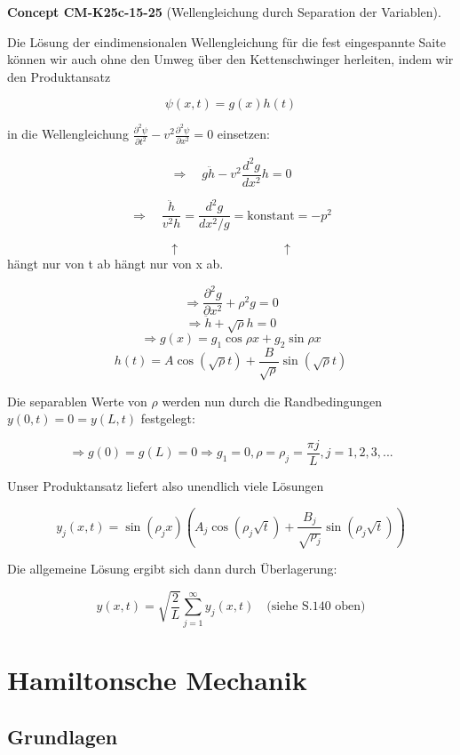 \documentclass[10pt, letterpaper]{article}
\newcommand{\CustomHeading}[3]{%
  \par\medskip\noindent%
  \textbf{#1 #2} \textnormal{(#3)}.\enskip%
}
\newenvironment{CONC}[2]{\CustomHeading{Concept}{#1}{#2}}{}
\begin{document}
\begin{CONC}{CM-K25c-15-25}{Wellengleichung durch Separation der Variablen}
Die Lösung der eindimensionalen Wellengleichung für die fest eingespannte Saite können wir auch ohne den Umweg über den Kettenschwinger herleiten, indem wir den Produktansatz

\[\psi(x,t) = g(x)h(t)\]

in die Wellengleichung $\frac{\partial^2\psi}{\partial t^2} - v^2\frac{\partial^2\psi}{\partial x^2} = 0$ einsetzen:

\[\Rightarrow \quad g\ddot{h} - v^2\frac{d^2g}{dx^2}h = 0\]

\[\Rightarrow \quad \frac{\ddot{h}}{v^2h} = \frac{d^2g}{dx^2/g} = \text{konstant} = -p^2\]

\[\uparrow \qquad\qquad\qquad\qquad \uparrow\]
hängt nur von t ab \qquad hängt nur von x ab.

\[
\Rightarrow \frac{\partial^2 g}{\partial x^2} + \rho^2 g = 0
\]
\[
\Rightarrow \ddot{h} + \sqrt{\rho} h = 0
\]
\[
\Rightarrow g(x) = g_1 \cos \rho x + g_2 \sin \rho x
\]
\[
h(t) = A \cos(\sqrt{\rho}t) + \frac{B}{\sqrt{\rho}} \sin(\sqrt{\rho}t)
\]

Die separablen Werte von $\rho$ werden nun durch die Randbedingungen $y(0,t) = 0 = y(L,t)$ festgelegt:

\[
\Rightarrow g(0) = g(L) = 0 \Rightarrow g_1 = 0, \rho = \rho_j = \frac{\pi j}{L}, j=1,2,3,...
\]

Unser Produktansatz liefert also unendlich viele Lösungen

\[
y_j(x,t) = \sin(\rho_j x)\left(A_j \cos(\rho_j \sqrt{t}) + \frac{B_j}{\sqrt{\rho_j}} \sin(\rho_j \sqrt{t})\right)
\]

Die allgemeine Lösung ergibt sich dann durch Überlagerung:

\[
y(x,t) = \sqrt{\frac{2}{L}} \sum_{j=1}^{\infty} y_j(x,t) \quad \text{(siehe S.140 oben)}
\]
\end{CONC}

\section{Hamiltonsche Mechanik}

\subsection{Grundlagen}
\end{document}
